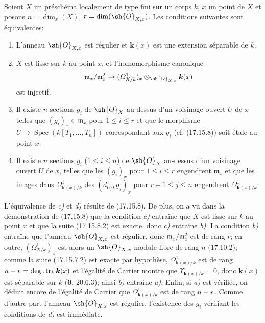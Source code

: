 \begin{corollary}[17.15.9]
\label{IV.17.15.9}
Soient $X$ un préschéma localement de type fini sur un corps $k$, $x$ un point de $X$ et posons $n=\dim_x(X)$, $r=\dim(\sh{O}_{X,x})$. Les conditions suivantes sont équivalentes:
\begin{enumerate}
  \item[\textup{a)}] L'anneau $\sh{O}_{X,x}$ est régulier et $\boldsymbol{k}(x)$ est une extension séparable de $k$.
  \item[\textup{b)}] $X$ est lisse sur $k$ au point $x$, et l'homomorphisme canonique
  \[
  \mathfrak m_x/\mathfrak m_x^2\to(\varOmega^1_{X/k})_x\otimes_{\sh{O}_{X,x}}\boldsymbol{k}(x)
  \]
  est injectif.
  \item[\textup{c)}] Il existe $n$ sections $g_i$ de $\sh{O}_X$ au-dessus d'un voisinage ouvert $U$ de $x$ telles que $(g_i)_x\in\mathfrak m_x$ pour $1\leq i\leq r$ et que le morphisme $U\to\operatorname{Spec}(k[T_1,\ldots,T_n])$ correspondant aux $g_i$ \textup{(cf. (17.15.8))} soit étale au point $x$.
  \item[\textup{d)}] Il existe $n$ sections $g_i$ \textup{(}$1\leq i\leq n$\textup{)} de $\sh{O}_X$ au-dessus d'un voisinage ouvert $U$ de $x$, telles que les $(g_i)_x$ pour $1\leq i\leq r$ engendrent $\mathfrak m_x$ et que les images dans $\Omega^1_{\mathbf{k}(x)/k}$ des $(d_{U/k}g_j)_x$ pour $r+1\leq j\leq n$ engendrent $\Omega^1_{\mathbf{k}(x)/k}$.
\end{enumerate}
\end{corollary}

L'équivalence de \emph{c)} et \emph{d)} résulte de (17.15.8). De plus, on a vu dans la démonstration de (17.15.8) que la condition \emph{c)} entraîne que $X$ est lisse sur $k$ au point $x$ et que la suite (17.15.8.2) est exacte, donc \emph{c)} entraîne \emph{b)}. La condition \emph{b)} entraîne que l'anneau $\sh{O}_{X,x}$ est régulier, donc $\mathfrak m_x/\mathfrak m_x^2$ est de rang $r$; en outre, $(\varOmega^1_{X/k})_x$ est alors un $\sh{O}_{X,x}$-module libre de rang $n$ (17.10.2); comme la suite (17.15.7.2) est exacte par hypothèse, $\Omega^1_{\mathbf{k}(x)/k}$ est de rang $n- r=\deg.\operatorname{tr}_k \boldsymbol{k}(x)$ et l'égalité de Cartier montre que $\Upsilon_{\mathbf{k}(x)/k}=0$, donc $\boldsymbol{k}(x)$ est séparable sur $k$ (\textbf{0}, 20.6.3); ainsi \emph{b)} entraîne \emph{a)}. Enfin, si \emph{a)}
est vérifiée, on déduit encore de l'égalité de Cartier que $\Omega^1_{\mathbf{k}(x)/k}$ est de rang $n- r$. Comme d'autre part l'anneau $\sh{O}_{X,x}$ est régulier, l'existence des $g_i$ vérifiant les conditions de \emph{d)} est immédiate.

